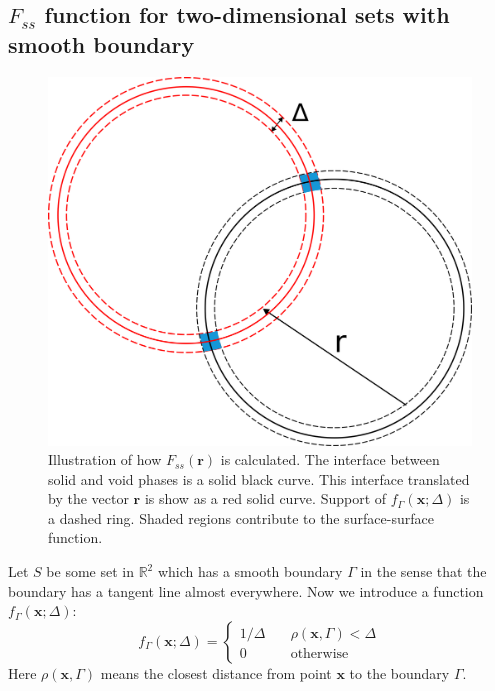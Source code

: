 \documentclass[preprint]{elsarticle}
\begin{document}
\subsection{$F_{ss}$ function for two-dimensional sets with smooth boundary}
\label{sec:fss-2d}
\begin{figure}
  \centering
  \includegraphics[width=0.8\linewidth]{images/Fss.png}
  \caption[]{Illustration of how $F_{ss}(\bm{r})$ is calculated. The interface
    between solid and void phases is a solid black curve. This interface
    translated by the vector $\bm{r}$ is show as a red solid curve. Support of
    $f_\Gamma(\bm{x}; \Delta)$ is a dashed ring. Shaded regions contribute to
    the surface-surface function.}
  \label{fig:Fss-explained}
\end{figure}
Let $S$ be some set in $\mathbb{R}^2$ which has a smooth boundary $\Gamma$ in
the sense that the boundary has a tangent line almost everywhere. Now we
introduce a function $f_\Gamma(\bm{x}; \Delta)$:
\begin{equation}
  f_\Gamma(\bm{x}; \Delta) = \left\{
  \begin{array}{ll}
    1/\Delta & \quad \rho(\bm{x}, \Gamma) < \Delta \\
    0 & \quad \text{otherwise}
  \end{array}
  \right. \label{eq:delta-sequence}
\end{equation}
Here $\rho(\bm{x}, \Gamma)$ means the closest distance from point $\bm{x}$ to the
boundary $\Gamma$.
\end{document}
